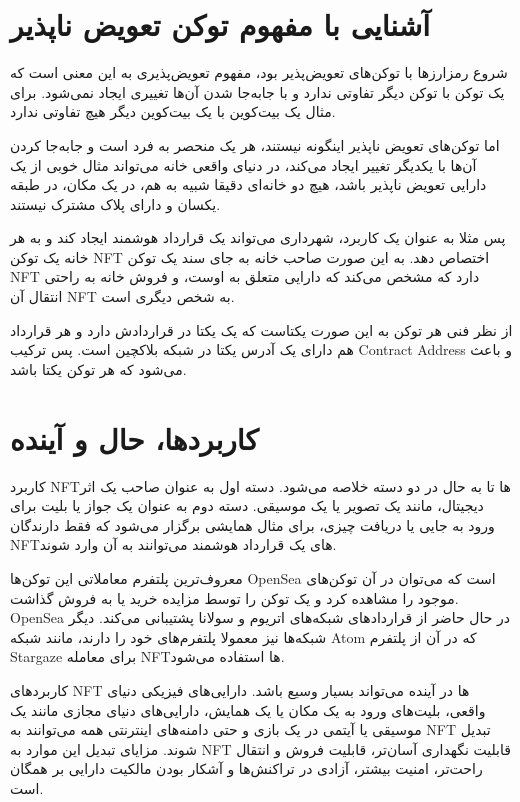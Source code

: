 \section{آشنایی با مفهوم توکن تعویض ناپذیر}
شروع رمزارزها با توکن‌های تعویض‌پذیر بود، مفهوم تعویض‌پذیری به این معنی است که یک توکن با توکن دیگر تفاوتی ندارد و با جابه‌جا شدن آن‌ها تغییری ایجاد نمی‌شود. برای مثال یک بیت‌کوین با یک بیت‌کوین دیگر هیچ تفاوتی ندارد.

اما توکن‌های تعویض ناپذیر اینگونه نیستند، هر یک منحصر به فرد است و جابه‌جا کردن آن‌ها با یکدیگر تغییر ایجاد می‌کند،‌ در دنیای واقعی خانه می‌تواند مثال خوبی از یک دارایی تعویض ناپذیر باشد، هیچ دو خانه‌ای دقیقا شبیه به هم، در یک مکان، در طبقه یکسان و دارای پلاک مشترک نیستند.

پس مثلا به عنوان یک کاربرد، شهرداری می‌تواند یک قرارداد هوشمند ایجاد کند و به هر خانه یک توکن NFT اختصاص دهد. به این صورت صاحب خانه به جای سند یک توکن NFT دارد که مشخص می‌کند که دارایی متعلق به اوست، و فروش خانه به راحتی انتقال آن NFT به شخص دیگری است.

از نظر فنی هر توکن به این صورت یکتاست که یک  یکتا در قراردادش دارد و هر قرارداد هم دارای یک آدرس یکتا در شبکه بلاکچین است. پس ترکیب Contract Address و  باعث می‌شود که هر توکن یکتا باشد.


\section{کاربردها، حال و آینده}
کاربرد NFTها تا به حال در دو دسته خلاصه می‌شود. دسته اول به عنوان صاحب یک اثر دیجیتال، مانند یک تصویر یا یک موسیقی. دسته دوم به عنوان یک جواز یا بلیت برای ورود به جایی یا دریافت چیزی، برای مثال همایشی برگزار می‌شود که فقط دارندگان NFTهای یک قرارداد هوشمند می‌توانند به آن وارد شوند.

معروف‌ترین پلتفرم معاملاتی این توکن‌ها OpenSea است که می‌توان در آن توکن‌های موجود را مشاهده کرد و یک توکن را توسط مزایده خرید یا به فروش گذاشت. OpenSea در حال حاضر از قراردادهای شبکه‌های اتریوم و سولانا پشتیبانی می‌کند. دیگر شبکه‌ها نیز معمولا پلتفرم‌های خود را دارند، مانند شبکه Atom که در آن از پلتفرم Stargaze برای معامله NFTها استفاده می‌شود.

کاربردهای NFT ها در آینده می‌تواند بسیار وسیع باشد. دارایی‌های فیزیکی دنیای واقعی، بلیت‌های ورود به یک مکان یا یک همایش، دارایی‌های دنیای مجازی مانند یک موسیقی یا آیتمی در یک بازی و حتی دامنه‌های اینترنتی همه می‌توانند به NFT تبدیل شوند. مزایای تبدیل این موارد به NFT قابلیت نگهداری آسان‌تر، قابلیت فروش و انتقال راحت‌تر، امنیت بیشتر، آزادی در تراکنش‌ها و آشکار بودن مالکیت دارایی بر همگان است.


